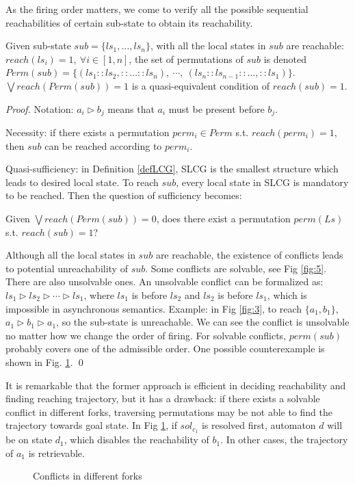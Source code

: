 \documentclass[runningheads]{llncs}
\begin{document}
As the firing order matters, we come to verify all the possible sequential reachabilities of certain sub-state to obtain its reachability.

\begin{theorem}\label{theoperm}
Given sub-state $sub=\{ls_1,\ldots,ls_n\}$, with all the local states in $sub$ are reachable: $reach (ls_i)=1,\ \forall i\in[1,n]$, the set of permutations of $sub$ is denoted $Perm (sub)=\{(ls_1::ls_2,::\ldots ::ls_n),\ \cdots,\ (ls_n::ls_{n-1}::\ldots,::ls_1)\}$. $\bigvee reach (Perm (sub))=1$ is a quasi-equivalent condition of $reach (sub)=1$.
\end{theorem}
\begin{proof}
Notation: $a_i\triangleright b_j$ means that $a_i$ must be present before $b_j$.

Necessity: if there exists a permutation $perm_i\in Perm$ s.t. $reach (perm_i)=1$, then $sub$ can be reached according to $perm_i$.

Quasi-sufficiency: in Definition \ref{defLCG}, SLCG is the smallest structure which leads to desired local state. 
To reach $sub$, every local state in SLCG is mandatory to be reached.
Then the question of sufficiency becomes:

Given $\bigvee reach (Perm (sub))=0$, does there exist a permutation $perm (Ls)$ s.t. $reach (sub)=1$?

Although all the local states in $sub$ are reachable, the existence of conflicts leads to potential unreachability of $sub$.
Some conflicts are solvable, see Fig \ref{fig:5}. There are also unsolvable ones.
An unsolvable conflict can be formalized as: $ls_1\triangleright ls_2 \triangleright \cdots \triangleright ls_1$, where $ls_1$ is before $ls_2$ and $ls_2$ is before $ls_1$, which is impossible in asynchronous semantics.
Example: in Fig \ref{fig:3}, to reach $\{a_1,b_1\}$, $a_1\triangleright b_1\triangleright a_1$, so the sub-state is unreachable. 
We can see the conflict is unsolvable no matter how we change the order of firing.
For solvable conflicts, $perm(sub)$ probably covers one of the admissible order.
One possible counterexample is shown in Fig. \ref{FigConflictInForks}. %
\qed\end{proof}

It is remarkable that the former approach is efficient in deciding reachability and finding reaching trajectory, but it has a drawback: if there exists a solvable conflict in different forks, traversing permutations may be not able to find the trajectory towards goal state.
In Fig \ref{FigConflictInForks}, if $sol_{c_1}$ is resolved first, automaton $d$ will be on state $d_1$, which disables the reachability of $b_1$.
In other cases, the trajectory of $a_1$ is retrievable.%
\begin{figure}[ht]
\centering

\caption{Conflicts in different forks}\label{FigConflictInForks}
\end{figure}
\end{document}
